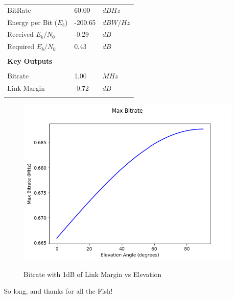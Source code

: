 \documentclass{article}
\begin{document}
\begin{center}
\begin{tabular}{p{3in}p{1in}l}
BitRate & 60.00 & $dBHz$ \\
Energy per Bit ($E_b$) & -200.65 & $dBW/Hz$ \\
Received $E_b/N_0$ & -0.29 & $dB$ \\
Required $E_b/N_0$ & 0.43 & $dB$ \\
\\
\textbf{Key Outputs} & & \\
\hline \\
Bitrate & 1.00 & $MHz$ \\
Link Margin & -0.72 & $dB$ \\
\\
\end{tabular}

  
  \begin{figure}
    \caption{Bitrate with 1dB of Link Margin vs Elevation}
    \includegraphics[width=\linewidth]{./max-bitrate.png}
    \label{fig::pfd::max-bitrate}
  \end{figure}
        
\end{center}

\newpage
So long, and thanks for all the Fish!

\end{document}
